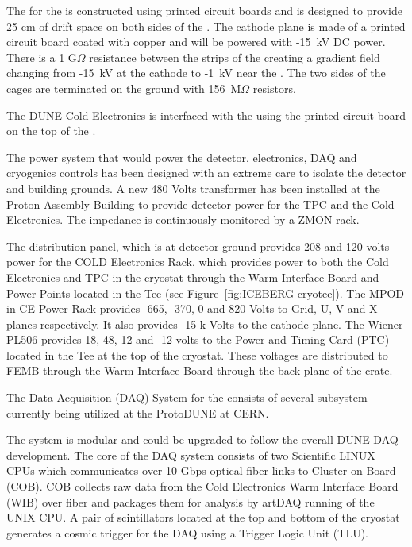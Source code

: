 The  for the  is constructed using printed circuit boards and is 
designed to provide 25 cm of drift space on both sides of the . The cathode 
plane is made of a printed circuit board coated with copper and will be powered with 
-15~kV DC power. There is a 1 G$\Omega$ resistance between the strips of the 
creating a gradient field changing from -15~kV at the cathode to -1~kV near the 
. The two sides of the  cages are terminated on the 
ground with 156~M$\Omega$ resistors. 

The DUNE Cold Electronics is interfaced with the  using the printed circuit board on the top of the .

The  power system that would power the detector, electronics, DAQ and cryogenics controls has been designed with an extreme care to isolate the detector and building grounds. A new 480 Volts transformer has been installed at the Proton Assembly Building to provide detector power for the TPC and the Cold Electronics. The impedance is continuously monitored by a ZMON rack. 

The distribution panel, which is at detector ground provides 208 and 120 volts power for the COLD Electronics Rack, which provides power to both the Cold Electronics and TPC in the cryostat through the Warm Interface Board and Power Points located in the Tee (see Figure~\ref{fig:ICEBERG-cryotee}). The MPOD in CE Power Rack provides -665, -370, 0 and 820 Volts to Grid, U, V and X planes respectively. It also provides -15 k Volts to the cathode plane. The Wiener PL506 provides 18, 48, 12 and -12 volts to the Power and Timing Card (PTC) located in the Tee at the top of the cryostat. These voltages are distributed to FEMB through the Warm Interface Board through the back plane of the crate.

The Data Acquisition (DAQ) System for the  consists of several subsystem currently being utilized at the ProtoDUNE at CERN.

The system is modular and could be upgraded to follow the overall DUNE DAQ development. The core of the DAQ system consists of two Scientific LINUX CPUs which communicates over 10 Gbps optical fiber links to Cluster on Board (COB). COB collects raw data from the Cold Electronics Warm Interface Board (WIB) over fiber and packages them for analysis by artDAQ running of the UNIX CPU. A pair of scintillators located at the top and bottom of the cryostat generates a cosmic trigger for the DAQ  using a Trigger Logic Unit (TLU).

